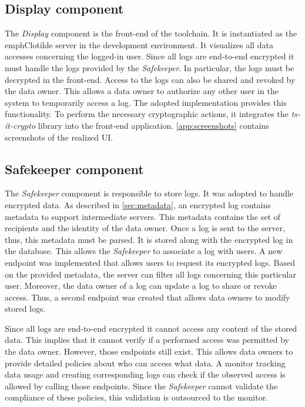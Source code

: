 \documentclass[../main.tex]{subfiles}
\begin{document}
\subsection{Display component}
The \emph{Display} component is the front-end of the toolchain.
It is instantiated as the emph{Clotilde} server in the development environment.
It visualizes all data accesses concerning the logged-in user.
Since all logs are end-to-end encrypted it must handle the logs provided by the \emph{Safekeeper}.
In particular, the logs must be decrypted in the front-end.
Access to the logs can also be shared and revoked by the data owner.
This allows a data owner to authorize any other user in the system to temporarily access a log.
The adopted implementation provides this functionality.
To perform the necessary cryptographic actions, it integrates the \emph{ts-it-crypto} library into the front-end application.
\cref{app:screenshots} contains screenshots of the realized UI.

\subsection{Safekeeper component}
\label{sec:implemenation-safekeeper}
The \emph{Safekeeper} component is responsible to store logs.
It was adopted to handle encrypted data.
As described in \cref{sec:metadata}, an encrypted log contains metadata to support intermediate servers.
This metadata contains the set of recipients and the identity of the data owner.
Once a log is sent to the server, thus, this metadata must be parsed.
It is stored along with the encrypted log in the database.
This allows the \emph{Safekeeper} to associate a log with users.
A new endpoint was implemented that allows users to request its encrypted logs.
Based on the provided metadata, the server can filter all logs concerning this particular user.
Moreover, the data owner of a log can update a log to share or revoke access.
Thus, a second endpoint was created that allows data owners to modify stored logs.

Since all logs are end-to-end encrypted it cannot access any content of the stored data.
This implies that it cannot verify if a performed access was permitted by the data owner.
However, those endpoints still exist.
This allows data owners to provide detailed policies about who can access what data.
A monitor tracking data usage and creating corresponding logs can check if the observed access is allowed by calling those endpoints.
Since the \emph{Safekeeper} cannot validate the compliance of these policies, this validation is outsourced to the monitor.
\end{document}
